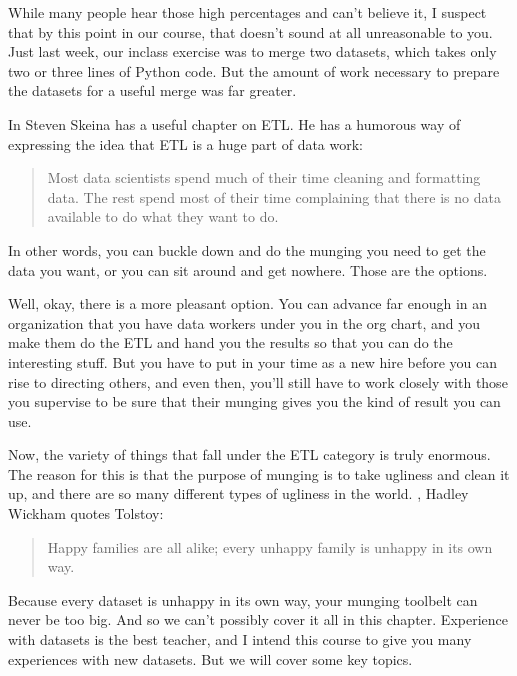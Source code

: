 \documentclass[letterpaper,10pt,english]{sphinxmanual}
\begin{document}
While many people hear those high percentages and can’t believe it, I suspect that by this point in our course, that doesn’t sound at all unreasonable to you.  Just last week, our in\sphinxhyphen{}class exercise was to merge two datasets, which takes only two or three lines of Python code.  But the amount of work necessary to prepare the datasets for a useful merge was far greater.

In  Steven Skeina has a useful chapter on ETL.  He has a humorous way of expressing the idea that ETL is a huge part of data work:
\begin{quote}

Most data scientists spend much of their time cleaning and formatting data. The rest spend most of their time complaining that there is no data available to do what they want to do.
\end{quote}

In other words, you can buckle down and do the munging you need to get the data you want, or you can sit around and get nowhere.  Those are the options.

Well, okay, there is a more pleasant option.  You can advance far enough in an organization that you have data workers under you in the org chart, and you make them do the ETL and hand you the results so that you can do the interesting stuff.  But you have to put in your time as a new hire before you can rise to directing others, and even then, you’ll still have to work closely with those you supervise to be sure that their munging gives you the kind of result you can use.

Now, the variety of things that fall under the ETL category is truly enormous.  The reason for this is that the purpose of munging is to take ugliness and clean it up, and there are so many different types of ugliness in the world.  , Hadley Wickham quotes Tolstoy:
\begin{quote}

Happy families are all alike; every unhappy family is unhappy in its own way.
\end{quote}

Because every dataset is unhappy in its own way, your munging toolbelt can never be too big.  And so we can’t possibly cover it all in this chapter.  Experience with datasets is the best teacher, and I intend this course to give you many experiences with new datasets.  But we will cover some key topics.
\end{document}
